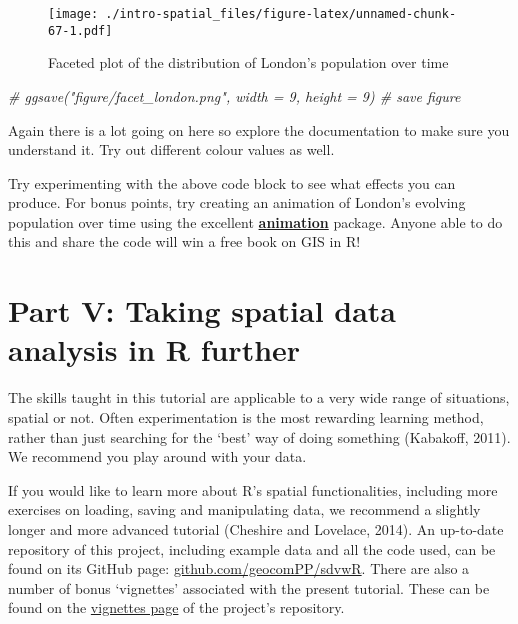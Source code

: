 \documentclass[]{article}
\newenvironment{Shaded}{}{}
\newcommand{\CommentTok}[1]{\textcolor[rgb]{0.38,0.63,0.69}{\textit{{#1}}}}
\begin{document}
\begin{figure}[htbp]
\centering
\texttt{[image: ./intro-spatial\_files/figure-latex/unnamed-chunk-67-1.pdf]}
\caption{Faceted plot of the distribution of London's population over
time}
\end{figure}

\begin{Shaded}
\begin{Highlighting}[]
\CommentTok{# ggsave("figure/facet_london.png", width = 9, height = 9) # save figure}
\end{Highlighting}
\end{Shaded}

Again there is a lot going on here so explore the documentation to make
sure you understand it. Try out different colour values as well.

Try experimenting with the above code block to see what effects you can
produce. For bonus points, try creating an animation of London's
evolving population over time using the excellent
\href{http://cran.r-project.org/web/packages/animation/index.html}{\textbf{animation}}
package. Anyone able to do this and share the code will win a free book
on GIS in R!

\clearpage

\section{Part V: Taking spatial data analysis in R
further}\label{part-v-taking-spatial-data-analysis-in-r-further}

The skills taught in this tutorial are applicable to a very wide range
of situations, spatial or not. Often experimentation is the most
rewarding learning method, rather than just searching for the `best' way
of doing something (Kabakoff, 2011). We recommend you play around with
your data.

If you would like to learn more about R's spatial functionalities,
including more exercises on loading, saving and manipulating data, we
recommend a slightly longer and more advanced tutorial (Cheshire and
Lovelace, 2014). An up-to-date repository of this project, including
example data and all the code used, can be found on its GitHub page:
\href{https://github.com/geocomPP/sdvwR}{github.com/geocomPP/sdvwR}.
There are also a number of bonus `vignettes' associated with the present
tutorial. These can be found on the
\href{https://github.com/Robinlovelace/Creating-maps-in-R/tree/master/vignettes}{vignettes
page} of the project's repository.
\end{document}
